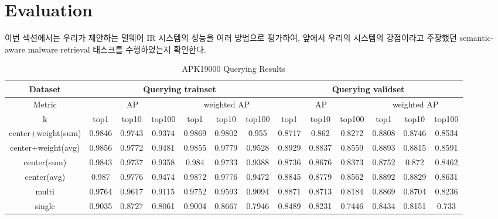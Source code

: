 \section{Evaluation}
이번 섹션에서는 우리가 제안하는 멀웨어 IR 시스템의 성능을 여러 방법으로 평가하여, 앞에서 우리의 시스템의 강점이라고 주장했던 semantic-aware malware retrieval 태스크를 수행하였는지 확인한다. 


\begin{table*}[!htb]%
\caption{APK19000 Querying Results}
\label{tab:apk_result}
\begin{minipage}{\textwidth}
\begin{center}
\begin{tabular}{|c|c|c|c|c|c|c|c|c|c|c|c|c|}
\hline
Dataset             & \multicolumn{6}{c|}{Querying trainset}                      & \multicolumn{6}{c|}{Querying validset}                      \\ \hline
Metric              & \multicolumn{3}{c|}{AP}  & \multicolumn{3}{c|}{weighted AP} & \multicolumn{3}{c|}{AP}  & \multicolumn{3}{c|}{weighted AP} \\ \hline
k              & top1   & top10  & top100 & top1      & top10     & top100   & top1   & top10  & top100 & top1      & top10     & top100   \\ \hline
center+weight(sum)  & 0.9846 & 0.9743 & 0.9374 & 0.9869    & 0.9802    & 0.955    & 0.8717 & 0.862  & 0.8272 & 0.8808    & 0.8746    & 0.8534   \\ \hline
center+weight(avg) & 0.9856 & 0.9772 & 0.9481 & 0.9855    & 0.9779    & 0.9528   & 0.8929 & 0.8837 & 0.8559 & 0.8893    & 0.8815    & 0.8591   \\ \hline
center(sum)         & 0.9843 & 0.9737 & 0.9358 & 0.984     & 0.9733    & 0.9388   & 0.8736 & 0.8676 & 0.8373 & 0.8752    & 0.872     & 0.8462   \\ \hline
center(avg)        & 0.987  & 0.9776 & 0.9474 & 0.9872    & 0.9776    & 0.9472   & 0.8845 & 0.8779 & 0.8562 & 0.8892    & 0.8829    & 0.8631   \\ \hline
multi               & 0.9764 & 0.9617 & 0.9115 & 0.9752    & 0.9593    & 0.9094   & 0.8871 & 0.8713 & 0.8184 & 0.8869    & 0.8704    & 0.8236   \\ \hline
single              & 0.9035 & 0.8727 & 0.8061 & 0.9004    & 0.8667    & 0.7946   & 0.8489 & 0.8231 & 0.7446 & 0.8434    & 0.8151    & 0.733    \\ \hline
\end{tabular}
\end{center}
\bigskip\centering
\end{minipage}
\end{table*}%


